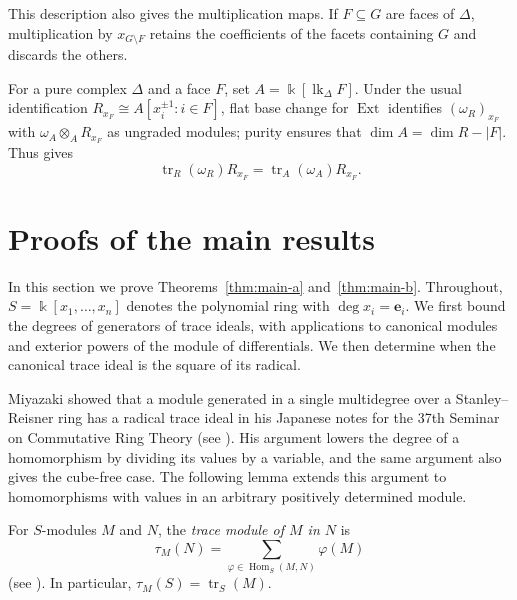 \documentclass[a4paper,11pt]{amsart}
\theoremstyle{plain}
\theoremstyle{definition}
\theoremstyle{remark}
\DeclareMathOperator{\tr}{tr}
\DeclareMathOperator{\Hom}{Hom}
\DeclareMathOperator{\Ext}{Ext}
\newcommand{\kk}{\Bbbk}
\newcommand{\ee}{\mathbf e}
\begin{document}
This description also gives the multiplication maps. If $F\subseteq G$ are faces of $\Delta$, multiplication by $x_{G\setminus F}$ retains the coefficients of the facets containing $G$ and discards the others.

For a pure complex $\Delta$ and a face $F$, set $A=\kk[\operatorname{lk}_\Delta F]$. Under the usual identification $R_{x_F}\cong A[x_i^{\pm1}:i\in F]$, flat base change for $\Ext$ identifies $(\omega_R)_{x_F}$ with $\omega_A\otimes_A R_{x_F}$ as ungraded modules; purity ensures that $\dim A=\dim R-|F|$. Thus \cite[Lemma~1.5\,(iii)]{HHS} gives
\begin{equation}\label{eq:trace-link}
\tr_R(\omega_R)R_{x_F}=\tr_A(\omega_A)R_{x_F}.
\end{equation}

\section{Proofs of the main results}\label{sec:trace-structure}

In this section we prove Theorems~\ref{thm:main-a} and~\ref{thm:main-b}. Throughout, $S=\kk[x_1,\ldots,x_n]$ denotes the polynomial ring with $\deg x_i=\ee_i$. We first bound the degrees of generators of trace ideals, with applications to canonical modules and exterior powers of the module of differentials. We then determine when the canonical trace ideal is the square of its radical.

Miyazaki showed that a module generated in a single multidegree over a Stanley--Reisner ring has a radical trace ideal in his Japanese notes for the 37th Seminar on Commutative Ring Theory (see \cite[p.~8]{MiyazakiSem26}). His argument lowers the degree of a homomorphism by dividing its values by a variable, and the same argument also gives the cube-free case. The following lemma extends this argument to homomorphisms with values in an arbitrary positively determined module.

For $S$-modules $M$ and $N$, the \emph{trace module of $M$ in $N$} is
\[
\tau_M(N)=\sum_{\varphi\in\Hom_S(M,N)}\varphi(M)
\]
(see \cite[Definition~2.1]{LP22}). In particular, $\tau_M(S)=\tr_S(M)$.
\end{document}
